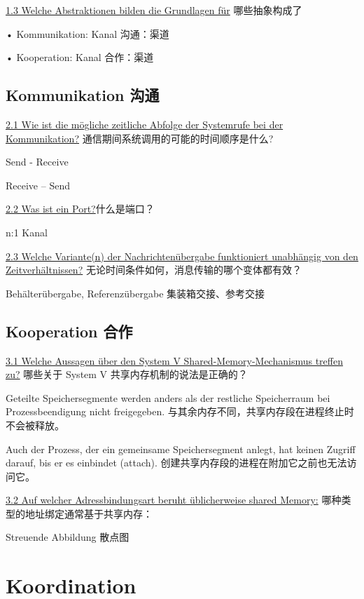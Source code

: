 \documentclass[fleqn]{article}
\begin{document}
\noindent\uline{1.3 Welche Abstraktionen bilden die Grundlagen für}
哪些抽象构成了

•	Kommunikation:  Kanal   沟通：渠道

•	Kooperation:   Kanal   合作：渠道


\subsection{Kommunikation 沟通}

\noindent\uline{2.1 Wie ist die mögliche zeitliche Abfolge der Systemrufe bei der Kommunikation?}
通信期间系统调用的可能的时间顺序是什么?

Send - Receive

Receive – Send

\noindent\uline{2.2 Was ist ein Port?}什么是端口？

n:1 Kanal

\noindent\uline{2.3 Welche Variante(n) der Nachrichtenübergabe funktioniert unabhängig von den Zeitverhältnissen?}
无论时间条件如何，消息传输的哪个变体都有效？

Behälterübergabe, Referenzübergabe 集装箱交接、参考交接


\subsection{Kooperation 合作}

\noindent\uline{3.1 Welche Aussagen über den System V Shared-Memory-Mechanismus treffen zu?}
哪些关于 System V 共享内存机制的说法是正确的？

Geteilte Speichersegmente werden anders als der restliche Speicherraum bei Prozessbeendigung nicht freigegeben.
与其余内存不同，共享内存段在进程终止时不会被释放。

Auch der Prozess, der ein gemeinsame Speichersegment anlegt, hat keinen Zugriff darauf, bis er es einbindet (attach).
创建共享内存段的进程在附加它之前也无法访问它。

\noindent\uline{3.2 Auf welcher Adressbindungsart beruht üblicherweise shared Memory:}
哪种类型的地址绑定通常基于共享内存：
	
Streuende Abbildung 散点图




\section{Koordination}
\end{document}
